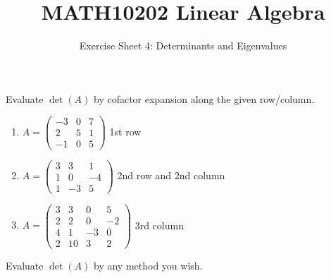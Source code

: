 \documentclass[english,12pt,a4paper]{scrartcl}
\title{MATH10202 Linear Algebra}
\subtitle{Exercise Sheet 4: Determinants and Eigenvalues}
\author{}
\date{\vspace{-5ex}}
\newenvironment{modenumerate}
  {\enumerate\setupmodenumerate}
  {\endenumerate}
\newif\ifmoditem
\newcommand{\setupmodenumerate}{%
  \global\moditemfalse
  \let\origmakelabel\makelabel
  \def\moditem##1{\global\moditemtrue\def\mesymbol{##1}\item}%
  \def\makelabel##1{%
  \origmakelabel{##1\ifmoditem\rlap{\mesymbol}\fi\enspace}%
\global\moditemfalse}%
}
\begin{document}
\maketitle

\begin{modenumerate}
  \moditem{*} Evaluate $\det(A)$ by cofactor expansion along the given 
  row/column.
    \begin{enumerate}
      \item $A =
        \begin{pmatrix}
          -3 & 0 & 7 \\
          2 & 5 & 1 \\
          -1 & 0 & 5
        \end{pmatrix}
        $ 1st row
      \item $A =
        \begin{pmatrix}
          3 & 3 & 1 \\
          1 & 0 & -4 \\
          1 & -3 & 5
        \end{pmatrix}
        $ 2nd row and 2nd column
      \item $A =
        \begin{pmatrix}
          3 & 3 & 0 & 5 \\
          2 & 2 & 0 & -2 \\
          4 & 1 & -3 & 0 \\
          2 & 10 & 3 & 2
        \end{pmatrix}
        $ 3rd column
    \end{enumerate}
  \moditem{*} Evaluate $\det(A)$ by any method you wish.
    \begin{multicols}{2}[\setlength{\columnseprule}{0pt}]
\end{multicols}
\end{modenumerate}
\end{document}
